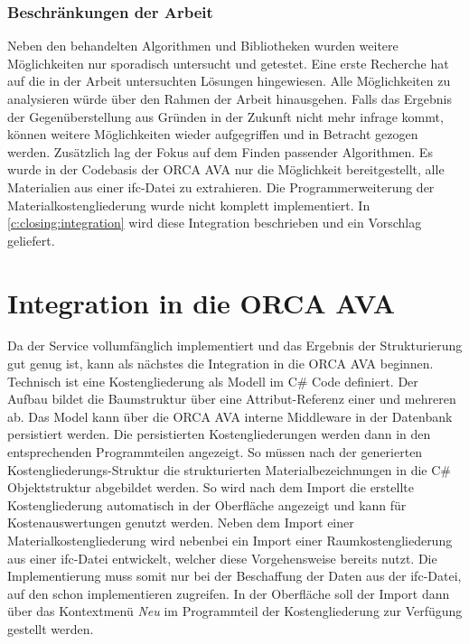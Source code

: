 \subsubsection{Beschränkungen der Arbeit}
Neben den behandelten Algorithmen und Bibliotheken wurden weitere Möglichkeiten nur sporadisch untersucht und getestet. Eine erste Recherche hat auf die in der Arbeit untersuchten Lösungen hingewiesen. Alle Möglichkeiten zu analysieren würde über den Rahmen der Arbeit hinausgehen. Falls das Ergebnis der Gegenüberstellung aus Gründen in der Zukunft nicht mehr infrage kommt, können weitere Möglichkeiten wieder aufgegriffen und in Betracht gezogen werden. Zusätzlich lag der Fokus auf dem Finden passender Algorithmen. Es wurde in der Codebasis der ORCA AVA nur die Möglichkeit bereitgestellt, alle Materialien aus einer \ac{ifc}-Datei zu extrahieren. Die Programmerweiterung der Materialkostengliederung wurde nicht komplett implementiert. In \autoref{c:closing:integration} wird diese Integration beschrieben und ein Vorschlag geliefert.

\section{Integration in die ORCA AVA}
\label{c:closing:integration}
Da der Service vollumfänglich implementiert und das Ergebnis der Strukturierung gut genug ist, kann als nächstes die Integration in die ORCA AVA beginnen. Technisch ist eine Kostengliederung als Modell im C\# Code definiert. Der Aufbau bildet die Baumstruktur über eine Attribut-Referenz einer  und mehreren  ab. Das Model kann über die ORCA AVA interne Middleware in der Datenbank persistiert werden. Die persistierten Kostengliederungen werden dann in den entsprechenden Programmteilen angezeigt. So müssen nach der generierten Kostengliederungs-Struktur die strukturierten Materialbezeichnungen in die C\# Objektstruktur abgebildet werden. So wird nach dem Import die erstellte Kostengliederung automatisch in der Oberfläche angezeigt und kann für Kostenauswertungen genutzt werden. Neben dem Import einer Materialkostengliederung wird nebenbei ein Import einer Raumkostengliederung aus einer \ac{ifc}-Datei entwickelt, welcher diese Vorgehensweise bereits nutzt. Die Implementierung muss somit nur bei der Beschaffung der Daten aus der \ac{ifc}-Datei, auf den schon implementieren  zugreifen. In der Oberfläche soll der Import dann über das Kontextmenü \textit{Neu} im Programmteil der Kostengliederung zur Verfügung gestellt werden. 

